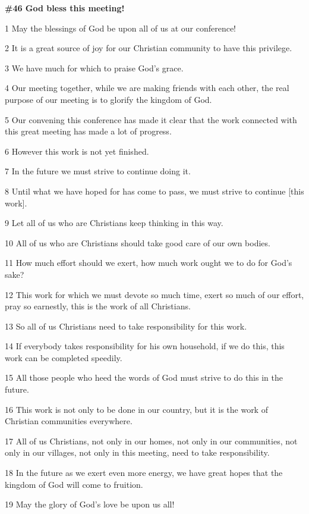 
\textbf{\#46 God bless this meeting!}

1 May the blessings of God be upon all of us at our conference!

2 It is a great source of joy for our Christian community to have this privilege.

3 We have much for which to praise God's grace.

4 Our meeting together, while we are making friends with each other, the real purpose
of our meeting is to glorify the kingdom of God.

5 Our convening this conference has made it clear that the work connected with
this great meeting has made a lot of progress.

6 However this work is not yet finished.

7 In the future we must strive to continue doing it.

8 Until what we have hoped for has come to pass, we must strive to continue [this
work].

9 Let all of us who are Christians keep thinking in this way.

10 All of us who are Christians should take good care of our own bodies.

11 How much effort should we exert, how much work ought we to do for God's sake?

12 This work for which we must devote so much time, exert so much of our effort,
pray so earnestly, this is the work of all Christians.

13 So all of us Christians need to take responsibility for this work.

14 If everybody takes responsibility for his own household, if we do this, this
work can be completed speedily.

15 All those people who heed the words of God must strive to do this in the future.

16 This work is not only to be done in our country, but it is the work of Christian
communities everywhere.

17 All of us Christians, not only in our homes, not only in our communities, not
only in our villages, not only in this meeting, need to take responsibility.

18 In the future as we exert even more energy, we have great hopes that the kingdom
of God will come to fruition.

19 May the glory of God's love be upon us all!


